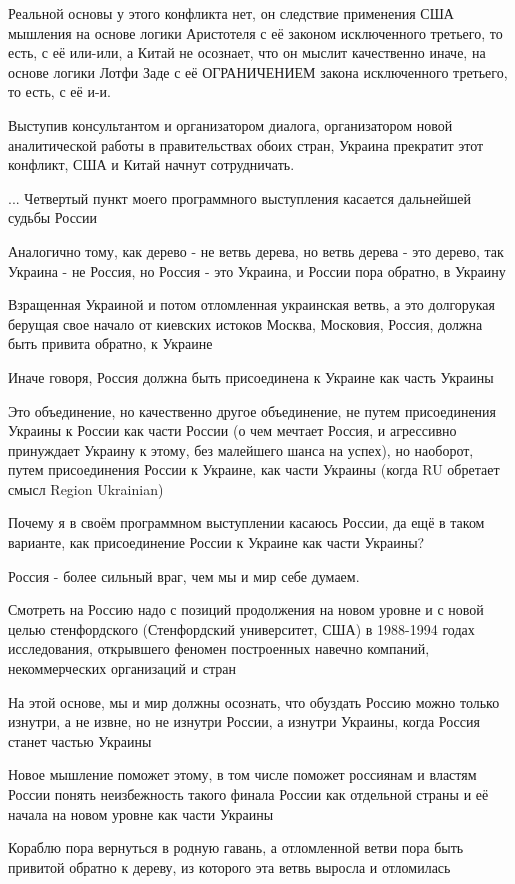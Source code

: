 Реальной основы у этого конфликта нет, он следствие применения США мышления на
основе логики Аристотеля с её законом исключенного третьего, то есть, с её
или-или, а Китай не осознает, что он мыслит качественно иначе, на основе логики
Лотфи Заде с её ОГРАНИЧЕНИЕМ закона исключенного третьего, то есть, с её и-и.

Выступив консультантом и организатором диалога, организатором новой
аналитической работы в правительствах обоих стран, Украина прекратит этот
конфликт, США и Китай начнут сотрудничать.

... Четвертый пункт моего программного выступления касается дальнейшей судьбы России

Аналогично тому, как дерево - не ветвь дерева, но ветвь дерева - это дерево,
так Украина - не Россия, но Россия - это Украина, и России пора обратно, в
Украину

Взращенная Украиной и потом отломленная украинская ветвь, а это долгорукая
берущая свое начало от киевских истоков Москва, Московия, Россия, должна быть
привита обратно, к Украине

Иначе говоря, Россия должна быть присоединена к Украине как часть Украины

Это объединение, но качественно другое объединение, не путем присоединения
Украины к России как части России (о чем мечтает Россия, и агрессивно
принуждает Украину к этому, без малейшего шанса на успех), но наоборот, путем
присоединения России к Украине, как части Украины (когда  RU обретает смысл
Region Ukrainian) 

Почему я в своём программном выступлении касаюсь России, да ещё в таком
варианте, как присоединение России к Украине как части Украины?

Россия - более сильный враг, чем мы и мир себе думаем.

Смотреть на Россию надо с позиций продолжения на новом уровне и с новой целью
стенфордского (Стенфордский университет, США) в 1988-1994 годах исследования,
открывшего феномен построенных навечно компаний, некоммерческих организаций и
стран

На этой основе, мы и мир должны осознать, что обуздать Россию можно только
изнутри, а не извне, но не изнутри России, а изнутри Украины, когда Россия
станет частью Украины

Новое мышление поможет этому, в том  числе поможет россиянам и властям России
понять неизбежность такого финала России как отдельной страны и её начала на
новом уровне как части Украины

Кораблю пора вернуться в родную гавань, а отломленной ветви пора быть привитой
обратно к дереву, из которого эта ветвь выросла и отломилась

